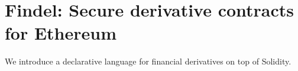 
\chapter{Findel: Secure derivative contracts for Ethereum} %

\label{Chapter10_Findel} %

We introduce a declarative language for financial derivatives on top of Solidity.